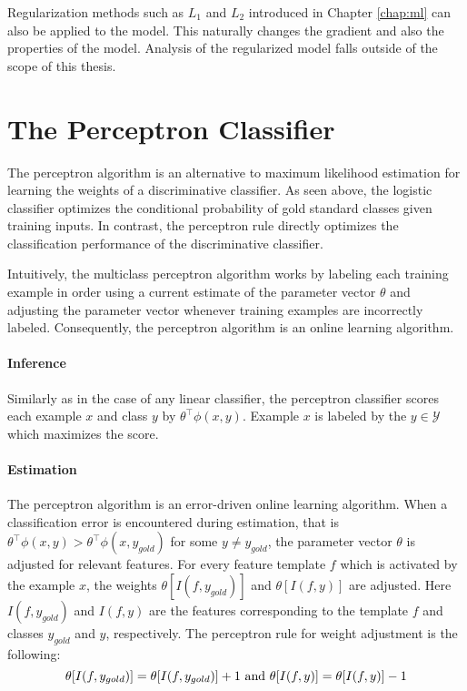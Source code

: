 Regularization methods such as $L_1$ and $L_2$ introduced in Chapter
\ref{chap:ml} can also be applied to the model. This naturally changes
the gradient and also the properties of the model. Analysis of the
regularized model falls outside of the scope of this thesis.

\section{The Perceptron Classifier}
\label{sec:perc}

The perceptron algorithm \citep{Rosenblatt1958} is an alternative to
maximum likelihood estimation for learning the weights of a
discriminative classifier. As seen above, the logistic classifier
optimizes the conditional probability of gold standard classes given
training inputs. In contrast, the perceptron rule directly optimizes
the classification performance of the discriminative classifier. 

Intuitively, the multiclass perceptron algorithm works by labeling
each training example in order using a current estimate of the
parameter vector $\theta$ and adjusting the parameter vector whenever
training examples are incorrectly labeled. Consequently, the perceptron
algorithm is an online learning algorithm.

\paragraph{Inference} Similarly as in the case of any linear
classifier, the perceptron classifier scores each example $x$ and class $y$ by
$\theta^\top\phi(x,y)$. Example $x$ is labeled by the $y \in \mathcal{Y}$ which maximizes the score.


\paragraph{Estimation} The perceptron algorithm is an error-driven
online learning algorithm. When a classification error is encountered
during estimation, that is $\theta^\top\phi(x,y) >
\theta^\top\phi(x,y_{gold})$ for some $y \ne y_{gold}$, the parameter vector $\theta$ is
adjusted for relevant features. For every feature template $f$ which
is activated by the example $x$, the weights $\theta[I(f, y_{gold})]$
and $\theta[I(f, y)]$ are adjusted. Here $I(f, y_{gold})$ and $I(f,
y)$ are the features corresponding to the template $f$ and classes
$y_{gold}$ and $y$, respectively. The perceptron rule for weight
adjustment is the following:
$$\theta[I(f, y_{gold})] = \theta[I(f, y_{gold})] + 1 {\rm\ and\ }\theta[I(f, y)] = \theta[I(f, y)] - 1$$


